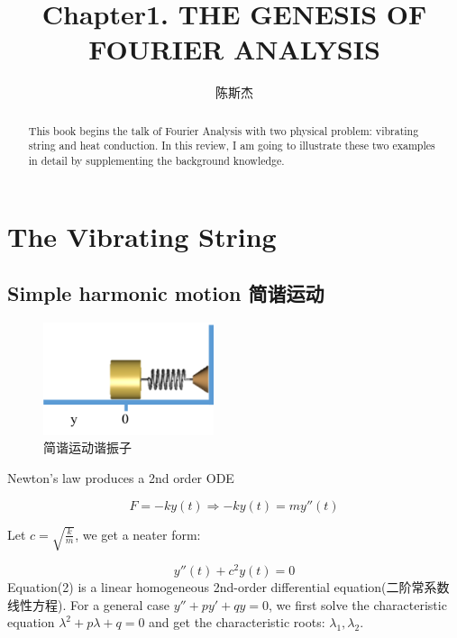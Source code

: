 \documentclass[UTF8,10pt,a4paper]{ctexart}
\author{陈斯杰}
\title{Chapter1. THE GENESIS OF FOURIER ANALYSIS}
\begin{document}
\maketitle
\begin{abstract}
This book begins the talk of Fourier Analysis with two 
physical problem: vibrating string and heat conduction.
In this review, I am going to illustrate these two examples
in detail by supplementing the background knowledge.
\end{abstract}

\section{The Vibrating String}
	\subsection{Simple harmonic motion 简谐运动}
		\begin{figure}[ht]
			\centering
			\includegraphics[width=5cm]{idealspring.png}
			\caption{简谐运动谐振子}
			\label{fig:xiantu}
		\end{figure}
		
		\noindent
		Newton's law produces a 2nd order ODE

		\begin{equation}
			F=-ky(t) \Rightarrow -ky(t)=my''(t)
		\end{equation}

		Let $c=\sqrt{\frac{k}{m}}$, we get a neater form: 
		
		\begin{equation}
			y''(t)+c^2y(t)=0
		\end{equation}				
		\noindent
		Equation(2)	is a linear homogeneous 2nd-order differential equation(二阶常系数线性方程).
		For a general case $y''+py'+qy=0$, we first solve the characteristic equation
		$\lambda^2+p\lambda+q=0$ and get the characteristic roots: $\lambda_1, \lambda_2$.
		
\end{document}
